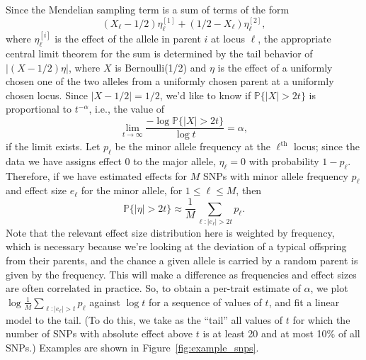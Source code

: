 \documentclass{article}
\renewcommand{\P}{\mathbb{P}}
\newcommand{\1}{\mathbbm{1}}
\theoremstyle{remark}
\theoremstyle{definition}
\begin{document}
Since the Mendelian sampling term is a sum of terms of the form
$$
    (X_\ell - 1/2) \eta_\ell^{[1]} + (1/2 - X_\ell) \eta_\ell^{[2]},
$$
where $\eta_\ell^{[i]}$ is the effect of the allele in parent $i$ at locus $\ell$,
the appropriate central limit theorem for the sum is determined by
the tail behavior of $|(X - 1/2) \eta|$,
where $X$ is Bernoulli(1/2) and $\eta$ is the effect
of a uniformly chosen one of the two alleles from a uniformly chosen parent
at a uniformly chosen locus.
Since $|X-1/2| = 1/2$, we'd like to know
if $\P\{|X|>2t\}$ is proportional to $t^{-\alpha}$,
i.e., the value of
$$
    \lim_{t \to \infty} \frac{ - \log \P\{ |X| > 2 t \} }{ \log t } = \alpha ,
$$
if the limit exists.
Let $p_\ell$ be the minor allele frequency at the $\ell^\text{th}$ locus;
since the data we have assigns effect 0 to the major allele,
$\eta_\ell = 0$ with probability $1-p_\ell$.
Therefore, if we have estimated effects for $M$ SNPs
with minor allele frequency $p_\ell$ and effect size $e_\ell$ for the minor allele,
for $1 \le \ell \le M$,
then
$$
    \P\{ |\eta| > 2t \} \approx \frac{1}{M} \sum_{\ell : |e_\ell| > 2t} p_\ell .
$$
Note that the relevant effect size distribution here is weighted by frequency, 
which is necessary because we're looking at the deviation of a typical offspring from their parents,
and the chance a given allele is carried by a random parent is given by the frequency.
This will make a difference as frequencies and effect sizes are often correlated in practice.
So, to obtain a per-trait estimate of $\alpha$,
we plot $\log \frac{1}{M} \sum_{\ell : |e_\ell| > t} p_\ell$ against $\log t$
for a sequence of values of $t$,
and fit a linear model to the tail.
(To do this,
we take as the ``tail''
all values of $t$ for which the number of SNPs with absolute effect above $t$
is at least 20 and at most 10\% of all SNPs.) 
Examples are shown in Figure~\ref{fig:example_snps}.
\end{document}
